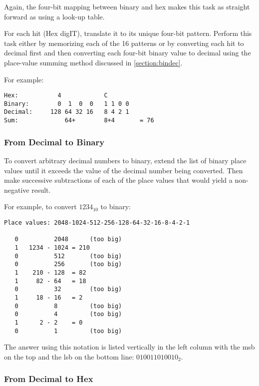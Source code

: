 Again, the four-bit mapping between binary and hex makes this
task as straight forward as using a look-up table.

For each \gls{hit} (Hex digIT), translate it to its unique four-bit pattern.
Perform this task either by memorizing each of the 16 patterns 
or by converting each hit to decimal first and then converting
each four-bit binary value to decimal using the place-value summing 
method discussed in \autoref{section:bindec}.

For example:

\begin{verbatim}
Hex:           4            C
Binary:        0  1  0  0   1 1 0 0
Decimal:     128 64 32 16   8 4 2 1
Sum:             64+        8+4       = 76
\end{verbatim}


\subsubsection{From Decimal to Binary}

To convert arbitrary decimal numbers to binary, extend the list 
of binary place values until it exceeds the value of the decimal 
number being converted.  Then make successive subtractions of each 
of the place values that would yield a non-negative result.

For example, to convert $1234_{10}$ to binary:

\begin{verbatim}
Place values: 2048-1024-512-256-128-64-32-16-8-4-2-1

   0          2048      (too big)
   1   1234 - 1024 = 210
   0          512       (too big)
   0          256       (too big)
   1    210 - 128  = 82
   1     82 - 64   = 18
   0          32        (too big)
   1     18 - 16   = 2
   0          8         (too big)
   0          4         (too big)
   1      2 - 2    = 0
   0          1         (too big)
\end{verbatim}

The answer using this notation is listed vertically
in the left column with the \acrshort{msb} on the top and 
the \acrshort{lsb} on the bottom line: $010011010010_2$.


\subsubsection{From Decimal to Hex}

